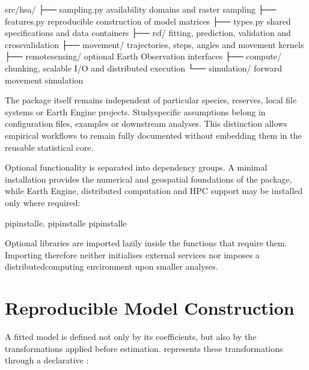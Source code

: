 \documentclass[letterpaper,10pt,english]{sphinxmanual}
\begin{document}
\begin{sphinxVerbatim}[commandchars=\\\{\}]
src/hsa/
├── sampling.py          \PYGZsh{} availability domains and raster sampling
├── features.py          \PYGZsh{} reproducible construction of model matrices
├── types.py             \PYGZsh{} shared specifications and data containers
├── rsf/                 \PYGZsh{} fitting, prediction, validation and cross\PYGZhy{}validation
├── movement/            \PYGZsh{} trajectories, steps, angles and movement kernels
├── remote\PYGZus{}sensing/      \PYGZsh{} optional Earth Observation interfaces
├── compute/             \PYGZsh{} chunking, scalable I/O and distributed execution
└── simulation/          \PYGZsh{} forward movement simulation
\end{sphinxVerbatim}

\sphinxAtStartPar
The package itself remains independent of particular species, reserves, local file systems or Earth Engine projects. Study\sphinxhyphen{}specific assumptions belong in configuration files, examples or downstream analyses. This distinction allows empirical workflows to remain fully documented without embedding them in the reusable statistical core.

\sphinxAtStartPar
Optional functionality is separated into dependency groups. A minimal installation provides the numerical and geospatial foundations of the package, while Earth Engine, distributed computation and HPC support may be installed only where required:

\begin{sphinxVerbatim}[commandchars=\\\{\}]
pipinstall\PYGZhy{}e.
pipinstall\PYGZhy{}e
pipinstall\PYGZhy{}e
\end{sphinxVerbatim}

\sphinxAtStartPar
Optional libraries are imported lazily inside the functions that require them. Importing  therefore neither initialises external services nor imposes a distributed\sphinxhyphen{}computing environment upon smaller analyses.


\section{Reproducible Model Construction}
\label{\detokenize{implementation:reproducible-model-construction}}
\sphinxAtStartPar
A fitted model is defined not only by its coefficients, but also by the transformations applied before estimation.  represents these transformations through a declarative :
\end{document}

